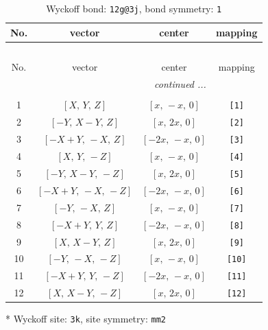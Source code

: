 \documentclass[fleqn,8pt]{jsarticle}
\begin{document}
\begin{longtable}{cccc}
\caption{Wyckoff bond: {\tt 12g@3j}, bond symmetry: {\tt 1}}
 \\
 \hline \hline
No. & vector & center & mapping \\ \hline \endfirsthead

\multicolumn{3}{l}{\tablename\ \thetable{}} \\
 \hline \hline
No. & vector & center & mapping \\ \hline \endhead

 \hline \hline
\multicolumn{3}{r}{\footnotesize\it continued ...} \\ \endfoot

 \hline \hline
\multicolumn{3}{r}{} \\ \endlastfoot

1 & $\left[ X,\, Y,\, Z \right]$ & $\left[ x,\, - x,\, 0 \right]$ & {\tt [1]} \\ \hline
2 & $\left[ - Y,\, X - Y,\, Z \right]$ & $\left[ x,\, 2 x,\, 0 \right]$ & {\tt [2]} \\ \hline
3 & $\left[ - X + Y,\, - X,\, Z \right]$ & $\left[ - 2 x,\, - x,\, 0 \right]$ & {\tt [3]} \\ \hline
4 & $\left[ X,\, Y,\, - Z \right]$ & $\left[ x,\, - x,\, 0 \right]$ & {\tt [4]} \\ \hline
5 & $\left[ - Y,\, X - Y,\, - Z \right]$ & $\left[ x,\, 2 x,\, 0 \right]$ & {\tt [5]} \\ \hline
6 & $\left[ - X + Y,\, - X,\, - Z \right]$ & $\left[ - 2 x,\, - x,\, 0 \right]$ & {\tt [6]} \\ \hline
7 & $\left[ - Y,\, - X,\, Z \right]$ & $\left[ x,\, - x,\, 0 \right]$ & {\tt [7]} \\ \hline
8 & $\left[ - X + Y,\, Y,\, Z \right]$ & $\left[ - 2 x,\, - x,\, 0 \right]$ & {\tt [8]} \\ \hline
9 & $\left[ X,\, X - Y,\, Z \right]$ & $\left[ x,\, 2 x,\, 0 \right]$ & {\tt [9]} \\ \hline
10 & $\left[ - Y,\, - X,\, - Z \right]$ & $\left[ x,\, - x,\, 0 \right]$ & {\tt [10]} \\ \hline
11 & $\left[ - X + Y,\, Y,\, - Z \right]$ & $\left[ - 2 x,\, - x,\, 0 \right]$ & {\tt [11]} \\ \hline
12 & $\left[ X,\, X - Y,\, - Z \right]$ & $\left[ x,\, 2 x,\, 0 \right]$ & {\tt [12]} \\
\end{longtable}
* Wyckoff site: {\tt 3k}, site symmetry: {\tt mm2}
\renewcommand{\arraystretch}{1.2}
\end{document}
